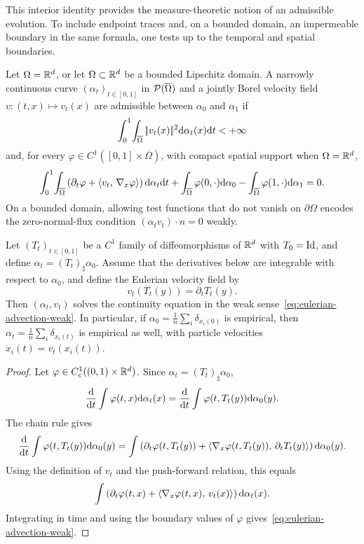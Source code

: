 This interior identity provides the measure-theoretic notion of an admissible evolution. To include endpoint traces and, on a bounded domain, an impermeable boundary in the same formula, one tests up to the temporal and spatial boundaries.
\begin{defn}\label{def-admissible-continuity-evolution}
Let $\Omega=\mathbb{R}^d$, or let $\Omega\subset\mathbb{R}^d$ be a bounded Lipschitz domain. A narrowly continuous curve $(\alpha_t)_{t\in[0,1]}$ in $\mathcal{P}(\overline\Omega)$ and a jointly Borel velocity field $v:(t,x)\mapsto v_t(x)$ are admissible between $\alpha_0$ and $\alpha_1$ if
\[
\int_0^1\!\int_{\overline\Omega}|\!| v_t(x) |\!|^2\mathrm{d}\alpha_t(x)\mathrm{d} t<+\infty
\]
and, for every $\varphi\in C^1([0,1]\times\overline\Omega)$, with compact spatial support when $\Omega=\mathbb{R}^d$,
\begin{equation}\label{eq-continuity-endpoint-no-flux}
\int_0^1\!\int_{\overline\Omega}
\left(\partial_t\varphi+\langle v_t,\,\nabla_x\varphi\rangle\right)\mathrm{d}\alpha_t\mathrm{d} t
+\int_{\overline\Omega}\varphi(0,\cdot)\mathrm{d}\alpha_0
-\int_{\overline\Omega}\varphi(1,\cdot)\mathrm{d}\alpha_1=0.
\end{equation}
On a bounded domain, allowing test functions that do not vanish on $\partial\Omega$ encodes the zero-normal-flux condition $(\alpha_t v_t)\cdot n=0$ weakly.
\end{defn}

\begin{prop}\label{prop-lagrangian-flow-continuity}
	Let $(T_t)_{t\in[0,1]}$ be a $C^1$ family of diffeomorphisms of $\mathbb{R}^d$ with $T_0=\mathrm{Id}$, and define $\alpha_t=(T_t)_\sharp\alpha_0$. Assume that the derivatives below are integrable with respect to $\alpha_0$, and define the Eulerian velocity field by
	\[
		v_t(T_t(y))=\partial_t T_t(y).
	\]
	Then $(\alpha_t,v_t)$ solves the continuity equation in the weak sense~\eqref{eq:eulerian-advection-weak}.
	In particular, if $\alpha_0=\frac1n\sum_i\delta_{x_i(0)}$ is empirical, then $\alpha_t=\frac1n\sum_i\delta_{x_i(t)}$ is empirical as well, with particle velocities $\dot x_i(t)=v_t(x_i(t))$.
\end{prop}

\begin{proof}
	Let $\varphi\in C_c^1((0,1)\times\mathbb{R}^d)$. Since $\alpha_t=(T_t)_\sharp\alpha_0$,
	\[
		\frac{\mathrm{d}}{\mathrm{d} t}\int \varphi(t,x)\mathrm{d}\alpha_t(x)
		=
		\frac{\mathrm{d}}{\mathrm{d} t}\int \varphi(t,T_t(y))\mathrm{d}\alpha_0(y).
	\]
	The chain rule gives
	\[
		\frac{\mathrm{d}}{\mathrm{d} t}\int \varphi(t,T_t(y))\mathrm{d}\alpha_0(y)
		=
		\int
		\left(
			\partial_t\varphi(t,T_t(y))
			+\langle \nabla_x\varphi(t,T_t(y)),\,\partial_t T_t(y)\rangle
		\right)
		\mathrm{d}\alpha_0(y).
	\]
	Using the definition of $v_t$ and the push-forward relation, this equals
	\[
		\int
		\left(
			\partial_t\varphi(t,x)+\langle \nabla_x\varphi(t,x),\,v_t(x)\rangle
		\right)
		\mathrm{d}\alpha_t(x).
	\]
	Integrating in time and using the boundary values of $\varphi$ gives~\eqref{eq:eulerian-advection-weak}.
\end{proof}

